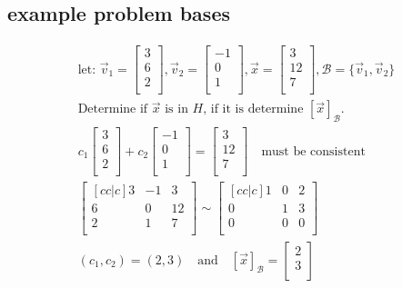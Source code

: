 \documentclass[11pt, a4paper]{article}
\begin{document}
\subsection{example problem bases}
\begin{gather*}
    \text{let: } \vec{v}_1 = \begin{bmatrix} 3\\ 6\\ 2\\ \end{bmatrix},
                 \vec{v}_2 = \begin{bmatrix} -1\\ 0\\ 1\\ \end{bmatrix},
                 \vec{x} = \begin{bmatrix} 3\\ 12\\ 7\\ \end{bmatrix},
                 \mathcal{B} = \{ \vec{v}_1, \vec{v}_2 \}\\
    \text{Determine if $\vec{x}$ is in $H$, if it is determine $\left[ \vec{x} \right]_{\mathcal{B}}$.}\\
    c_1 \begin{bmatrix} 3\\ 6\\ 2\\ \end{bmatrix} + c_2 \begin{bmatrix} -1\\ 0\\ 1\\ \end{bmatrix} = \begin{bmatrix} 3\\ 12\\ 7\\ \end{bmatrix} \quad \text{must be consistent}\\
    \begin{bmatrix}[cc|c]
        3 & -1 & 3\\
        6 & 0 & 12\\
        2 & 1 & 7\\
    \end{bmatrix}
        \sim
    \begin{bmatrix}[cc|c]
        1 & 0 & 2\\
        0 & 1 & 3\\
        0 & 0 & 0\\
    \end{bmatrix}\\
    (c_1, c_2) = (2,3) \quad \text{and} \quad \left[ \vec{x} \right]_{\mathcal{B}} = 
    \begin{bmatrix} 
        2\\
        3\\
    \end{bmatrix}
\end{gather*}
\end{document}
